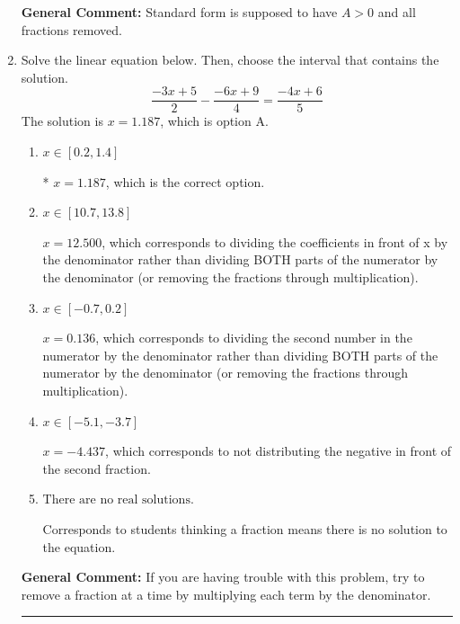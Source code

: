 \documentclass{extbook}[14pt]
\newcommand{\litem}[1]{\item #1

\rule{\textwidth}{0.4pt}}
\begin{document}
\begin{enumerate}
{\textbf{General Comment:} Standard form is supposed to have $A > 0$ and all fractions removed.
}
\litem{
Solve the linear equation below. Then, choose the interval that contains the solution.
\[ \frac{-3x + 5}{2} - \frac{-6x + 9}{4} = \frac{-4x + 6}{5} \]The solution is \( x = 1.187 \), which is option A.\begin{enumerate}[label=\Alph*.]
\item \( x \in [0.2, 1.4] \)

* $x = 1.187$, which is the correct option.
\item \( x \in [10.7, 13.8] \)

 $x = 12.500$, which corresponds to dividing the coefficients in front of x by the denominator rather than dividing BOTH parts of the numerator by the denominator (or removing the fractions through multiplication).
\item \( x \in [-0.7, 0.2] \)

 $x = 0.136$, which corresponds to dividing the second number in the numerator by the denominator rather than dividing BOTH parts of the numerator by the denominator (or removing the fractions through multiplication).
\item \( x \in [-5.1, -3.7] \)

 $x = -4.437$, which corresponds to not distributing the negative in front of the second fraction.
\item \( \text{There are no real solutions.} \)

Corresponds to students thinking a fraction means there is no solution to the equation.
\end{enumerate}

\textbf{General Comment:} If you are having trouble with this problem, try to remove a fraction at a time by multiplying each term by the denominator.
}
\end{enumerate}
\end{document}
